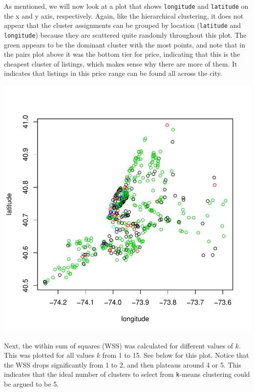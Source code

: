 \documentclass[11pt, a4paper]{article}
\begin{document}
As mentioned, we will now look at a plot that shows \texttt{longitude} and \texttt{latitude} on the x and y axis, respectively. Again, like the hierarchical clustering, it does not appear that the cluster assignments can be grouped by location (\texttt{latitude} and \texttt{longitude}) because they are scattered quite randomly throughout this plot. The green appears to be the dominant cluster with the most points, and note that in the pairs plot above it was the bottom tier for price, indicating that this is the cheapest cluster of listings, which makes sense why there are more of them. It indicates that listings in this price range can be found all across the city. 

\includegraphics{project_report-016}

Next, the within sum of squares (WSS) was calculated for different values of $k$. This was plotted for all values $k$ from 1 to 15. See below for this plot. Notice that the WSS drops significantly from 1 to 2, and then plateaus around 4 or 5. This indicates that the ideal number of clusters to select from \texttt{k}-means clustering could be argued to be 5.
\end{document}
